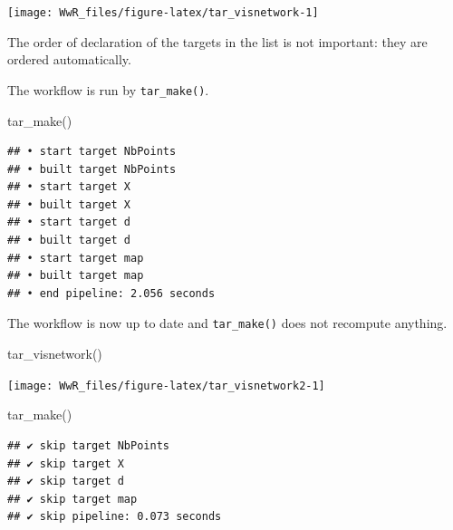 \documentclass[
  12pt,
  american,
  a4paper,
  extrafontsizes,onecolumn,openright
  ]{memoir}
\newenvironment{Shaded}{\begin{snugshade}}{\end{snugshade}}
\newcommand{\FunctionTok}[1]{\textcolor[rgb]{0.00,0.00,0.00}{#1}}
\newcommand{\NormalTok}[1]{#1}
\begin{document}
\begin{center}\texttt{[image: WwR\_files/figure-latex/tar\_visnetwork-1]} \end{center}

\normalsize

The order of declaration of the targets in the list is not important: they are ordered automatically.

The workflow is run by \texttt{tar\_make()}.

\scriptsize

\begin{Shaded}
\begin{Highlighting}[]
\FunctionTok{tar\_make}\NormalTok{()}
\end{Highlighting}
\end{Shaded}

\begin{verbatim}
## • start target NbPoints
## • built target NbPoints
## • start target X
## • built target X
## • start target d
## • built target d
## • start target map
## • built target map
## • end pipeline: 2.056 seconds
\end{verbatim}

\normalsize

The workflow is now up to date and \texttt{tar\_make()} does not recompute anything.

\scriptsize

\begin{Shaded}
\begin{Highlighting}[]
\FunctionTok{tar\_visnetwork}\NormalTok{()}
\end{Highlighting}
\end{Shaded}

\begin{center}\texttt{[image: WwR\_files/figure-latex/tar\_visnetwork2-1]} \end{center}

\begin{Shaded}
\begin{Highlighting}[]
\FunctionTok{tar\_make}\NormalTok{()}
\end{Highlighting}
\end{Shaded}

\begin{verbatim}
## ✔ skip target NbPoints
## ✔ skip target X
## ✔ skip target d
## ✔ skip target map
## ✔ skip pipeline: 0.073 seconds
\end{verbatim}

\normalsize
\end{document}
